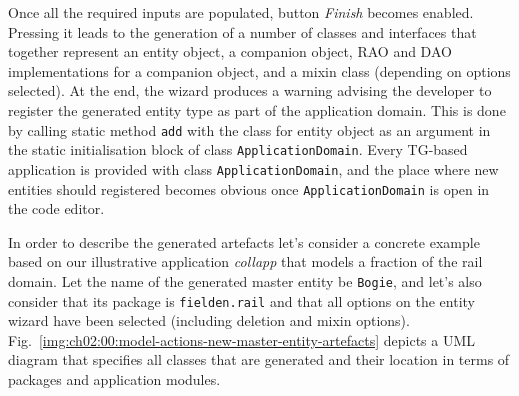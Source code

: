   Once all the required inputs are populated, button \emph{Finish} becomes enabled.
  Pressing it leads to the generation of a number of classes and interfaces that together represent an entity object, a companion object, RAO and DAO implementations for a companion object, and a mixin class (depending on options selected).
  At the end, the wizard produces a warning advising the developer to register the generated entity type as part of the application domain.
  This is done by calling static method \texttt{add} with the class for entity object as an argument in the static initialisation block of class \texttt{ApplicationDomain}.
  Every TG-based application is provided with class \texttt{ApplicationDomain}, and the place where new entities should registered becomes obvious once \texttt{ApplicationDomain} is open in the code editor.
  
  In order to describe the generated artefacts let's consider a concrete example based on our illustrative application \emph{collapp} that models a fraction of the rail domain.
  Let the name of the generated master entity be \texttt{Bogie}, and let's also consider that its package is \texttt{fielden.rail} and that all options on the entity wizard have been selected (including deletion and mixin options).
  Fig.~\ref{img:ch02:00:model-actions-new-master-entity-artefacts} depicts a UML diagram that specifies all classes that are generated and their location in terms of packages and application modules.
  
